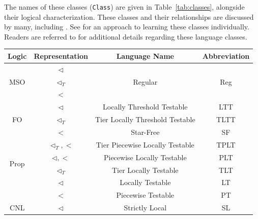 \documentclass[twoside,11pt]{article}
\newcommand{\ttt}[1]{\texttt{#1}}
\newcommand{\tttx}[1]{\ttt{#1}\xspace}
\newcommand{\Class}{\tttx{Class}}
\begin{document}
The names of these classes (\Class) are given in
Table~\ref{tab:classes}, alongside their logical
characterization. These classes and their relationships are discussed
by many, including \citet{McNaughtonPapert1971, Thomas1982,
  Thomas1997, RogersPullum2011, Rogers-HeinzEtAl-2013-CSC,
  rogers-lambert-2019-classes}. See \citet{Lambert+2021-TESRL} for an
approach to learning these classes individually. Readers are referred
to \citet{mlregtest} for additional details regarding these language
classes.
\begin{table}[!t]
  \centering
  \begin{tabular}{cccc}
    \toprule
    Logic                 & Representation       & Language Name                     & Abbreviation          \\
    \midrule
    \multirow{3}{*}{MSO}  & $\triangleleft$      & \multirow{3}{*}{Regular}          & \multirow{3}{*}{Reg} \\
                          & $\triangleleft_T$    &                                   &                      \\
                          & $<$                  &                                   &                      \\
    \midrule
    \multirow{3}{*}{FO}   & $\triangleleft$      & Locally Threshold Testable        & LTT                  \\
                          & $\triangleleft_T$    & Tier Locally Threshold Testable   & TLTT                 \\
                          & $<$                  & Star-Free                         & SF                   \\
    \midrule
    \multirow{4}{*}{Prop} & $\triangleleft_T, <$ & Tier Piecewise Locally Testable   & TPLT                 \\
                          & $\triangleleft, <$   & Piecewise Locally Testable        & PLT                  \\
                          & $\triangleleft_T$    & Tier Locally Testable             & TLT                  \\
                          & $\triangleleft$      & Locally Testable                  & LT                   \\
                          & $<$                  & Piecewise Testable                & PT                   \\
    \midrule
    \multirow{3}{*}{CNL}  & $\triangleleft$      & Strictly Local                    & SL                   \\

\end{tabular}
\end{table}
\end{document}
